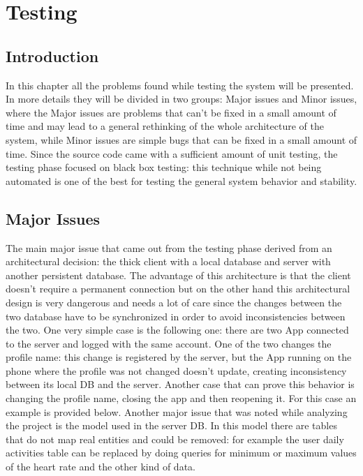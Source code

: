 \section{Testing}

\subsection{Introduction}

In this chapter all the problems found while testing the system will be presented. In more details they will be divided in two groups: Major issues and Minor issues, where the Major issues are problems that can't be fixed in a small amount of time and may lead to a general rethinking of the whole architecture of the system, while Minor issues are simple bugs that can be fixed in a small amount of time.
Since the source code came with a sufficient amount of unit testing, the testing phase focused on black box testing: this technique while not being automated is one of the best for testing the general system behavior and stability.

\subsection{Major Issues}
The main major issue that came out from the testing phase derived from an architectural decision: the thick client with a local database and server with another persistent database. The advantage of this architecture is that the client doesn't require a permanent connection but on the other hand this architectural design is very dangerous and needs a lot of care since the changes between the two database have to be synchronized in order to avoid inconsistencies between the two.
One very simple case is the following one: there are two App connected to the server and logged with the same account. One of the two changes the profile name: this change is registered by the server, but the App running on the phone where the profile was not changed doesn't update, creating inconsistency between its local DB and the server.
Another case that can prove this behavior is changing the profile name, closing the app and then reopening it. For this case an example is provided below.
Another major issue that was noted while analyzing the project is the model used in the server DB. In this model there are tables that do not map real entities and could be removed: for example the user daily activities table can be replaced by doing queries for minimum or maximum values of the heart rate and the other kind of data.


